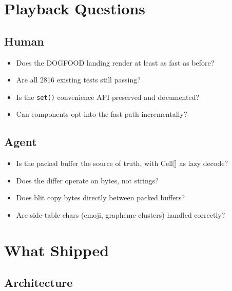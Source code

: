 \section{Playback Questions}\label{record-250-playback-questions}

\subsection{Human}\label{record-250-human}

\begin{itemize}
\tightlist
\item[$\boxtimes$]
  Does the DOGFOOD landing render at least as fast as before?
\item[$\boxtimes$]
  Are all 2816 existing tests still passing?
\item[$\boxtimes$]
  Is the \texttt{s\allowbreak{}e\allowbreak{}t\allowbreak{}(\allowbreak{})} convenience API preserved and documented?
\item[$\boxtimes$]
  Can components opt into the fast path incrementally?
\end{itemize}

\subsection{Agent}\label{record-250-agent}

\begin{itemize}
\tightlist
\item[$\boxtimes$]
  Is the packed buffer the source of truth, with Cell{[}{]} as lazy decode?
\item[$\boxtimes$]
  Does the differ operate on bytes, not strings?
\item[$\boxtimes$]
  Does blit copy bytes directly between packed buffers?
\item[$\boxtimes$]
  Are side-table chars (emoji, grapheme clusters) handled correctly?
\end{itemize}

\section{What Shipped}\label{record-250-what-shipped}

\subsection{Architecture}\label{record-250-architecture}


